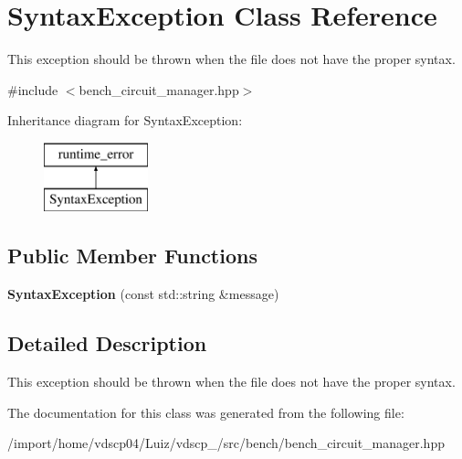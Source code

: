 \section{Syntax\+Exception Class Reference}
\label{classSyntaxException}


This exception should be thrown when the file does not have the proper syntax.  




{\ttfamily \#include $<$bench\+\_\+circuit\+\_\+manager.\+hpp$>$}

Inheritance diagram for Syntax\+Exception\+:\begin{figure}[H]
\begin{center}
\leavevmode
\includegraphics[height=2.000000cm]{classSyntaxException}
\end{center}
\end{figure}
\subsection*{Public Member Functions}
\begin{DoxyCompactItemize}
\item 
{\bfseries Syntax\+Exception} (const std\+::string \&message)\label{classSyntaxException_a017056b4446f0770e521c995c661aa25}

\end{DoxyCompactItemize}


\subsection{Detailed Description}
This exception should be thrown when the file does not have the proper syntax. 

The documentation for this class was generated from the following file\+:\begin{DoxyCompactItemize}
\item 
/import/home/vdscp04/\+Luiz/vdscp\+\_/src/bench/bench\+\_\+circuit\+\_\+manager.\+hpp\end{DoxyCompactItemize}

